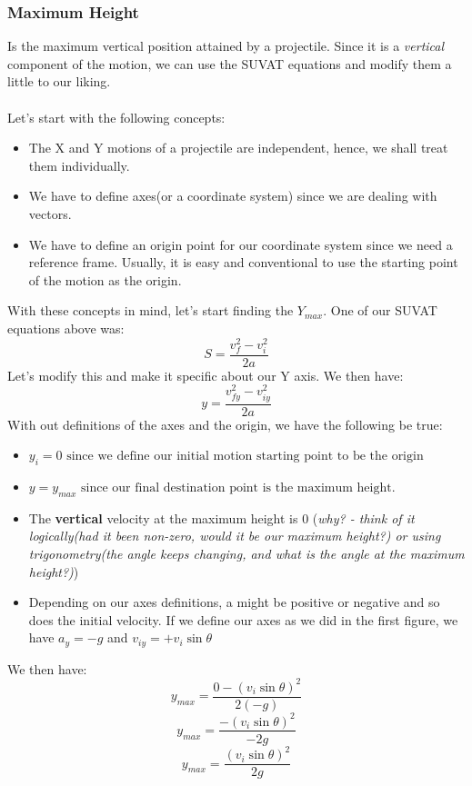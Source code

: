 \documentclass[9pt]{article}
\begin{document}
	\subsubsection*{Maximum Height}
	Is the maximum vertical position attained by a projectile. Since it is a \textit{vertical} component of the motion, we can use the SUVAT equations and modify them a little to our liking.\\ \\
	Let's start with the following concepts:
	\begin{itemize}
		\item The X and Y motions of a projectile are independent, hence, we shall treat them individually.
		\item We have to define axes(or a coordinate system) since we are dealing with vectors.
		\item We have to define an origin point for our coordinate system since we need a reference frame. Usually, it is easy and conventional to use the starting point of the motion as the origin.
	\end{itemize}
	With these concepts in mind, let's start finding the $Y_{max}$. One of our SUVAT equations above was:
	$$S=\dfrac{v_f^2-v_i^2}{2a}$$
	Let's modify this and make it specific about our Y axis. We then have:
	$$y=\dfrac{v_{fy}^2-v_{iy}^2}{2a}$$
	With out definitions of the axes and the origin, we have the following be true:
	\begin{itemize}
		\item $y_i=0\text{ since we define our initial motion starting point to be the origin}$
		\item $y=y_{max}\text{ since our final destination point is the maximum height.}$
		\item The \textbf{vertical} velocity at the maximum height is 0 (\textit{why? - think of it logically(had it been non-zero, would it be our maximum height?) or using trigonometry(the angle keeps changing, and what is the angle at the maximum height?)})
		\item Depending on our axes definitions, a might be positive or negative and so does the initial velocity. If we define our axes as we did in the first figure, we have $a_y=-g$ and $v_{iy}=+v_i\sin\theta$
	\end{itemize}
	We then have:
	$$y_{max}=\dfrac{0-(v_i\sin\theta)^2}{2(-g)}$$
	$$y_{max}=\dfrac{-(v_i\sin\theta)^2}{-2g}$$
	$$y_{max}=\dfrac{(v_i\sin\theta)^2}{2g}$$
\end{document}
